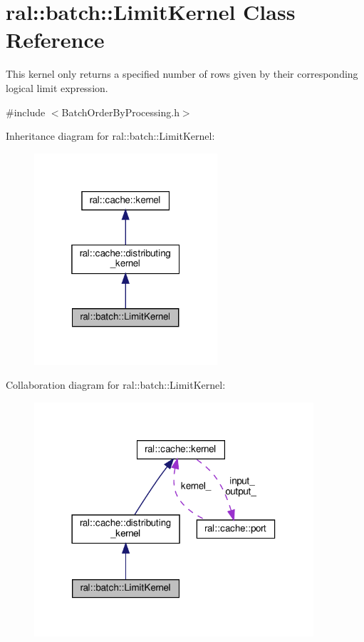\hypertarget{classral_1_1batch_1_1LimitKernel}{}\section{ral\+:\+:batch\+:\+:Limit\+Kernel Class Reference}
\label{classral_1_1batch_1_1LimitKernel}


This kernel only returns a specified number of rows given by their corresponding logical limit expression.  




{\ttfamily \#include $<$Batch\+Order\+By\+Processing.\+h$>$}



Inheritance diagram for ral\+:\+:batch\+:\+:Limit\+Kernel\+:\nopagebreak
\begin{figure}[H]
\begin{center}
\leavevmode
\includegraphics[width=193pt]{classral_1_1batch_1_1LimitKernel__inherit__graph}
\end{center}
\end{figure}


Collaboration diagram for ral\+:\+:batch\+:\+:Limit\+Kernel\+:\nopagebreak
\begin{figure}[H]
\begin{center}
\leavevmode
\includegraphics[width=294pt]{classral_1_1batch_1_1LimitKernel__coll__graph}
\end{center}
\end{figure}
